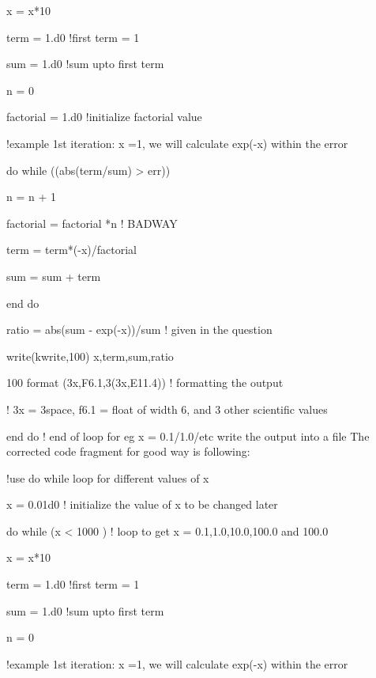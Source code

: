 \documentclass{article}
\begin{document}
        x = x*10                  
       
        term = 1.d0   !first term = 1
        
        sum = 1.d0    !sum upto first term
      
        n = 0
        
        factorial = 1.d0 !initialize factorial value
      
        !example 1st iteration: x =1, we will calculate exp(-x) within the error
                    
        do while ((abs(term/sum) > err))
        
            n = n + 1
            
            factorial = factorial *n ! BADWAY
            
            term = term*(-x)/factorial
             
            sum = sum + term
            
        end do
        
        ratio = abs(sum - exp(-x))/sum ! given in the question
             
        write(kwrite,100) x,term,sum,ratio
        
        100 format (3x,F6.1,3(3x,E11.4)) ! formatting the output
        
        ! 3x = 3space, f6.1 = float of width 6, and 3 other scientific values
    
    end do ! end of loop for eg x = 0.1/1.0/etc
write the output into a file
The corrected code fragment for good way is following:

!use do while loop for different values of x 
   
    x = 0.01d0           ! initialize the value of x to be changed later
    
    do while (x < 1000 ) ! loop to get x = 0.1,1.0,10.0,100.0 and 100.0 
                      
        x = x*10                  
       
        term = 1.d0   !first term = 1
        
        sum = 1.d0    !sum upto first term
      
        n = 0
      
        !example 1st iteration: x =1, we will calculate exp(-x) within the error
                    
\end{document}
